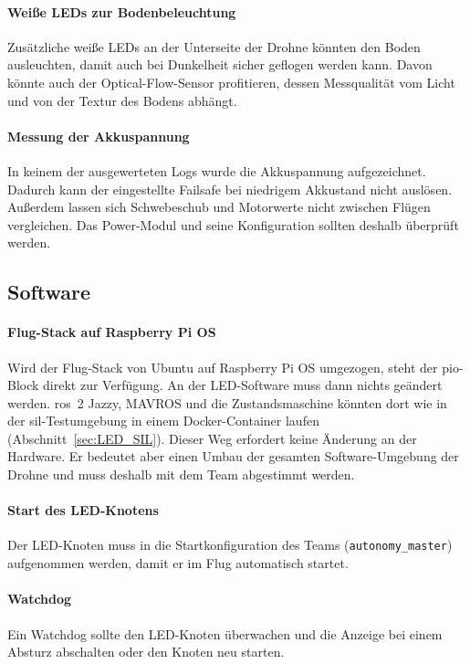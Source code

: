     \paragraph{Weiße LEDs zur Bodenbeleuchtung}
    Zusätzliche weiße LEDs an der Unterseite der Drohne könnten den Boden ausleuchten, damit auch bei Dunkelheit sicher geflogen werden kann. Davon könnte auch der Optical-Flow-Sensor profitieren, dessen Messqualität vom Licht und von der Textur des Bodens abhängt. %

    \paragraph{Messung der Akkuspannung}
    In keinem der ausgewerteten Logs wurde die Akkuspannung aufgezeichnet. Dadurch kann der eingestellte Failsafe bei niedrigem Akkustand nicht auslösen. Außerdem lassen sich Schwebeschub und Motorwerte nicht zwischen Flügen vergleichen. Das Power-Modul und seine Konfiguration sollten deshalb überprüft werden.

    \subsection{Software}
    \label{sec:Ausblick_Software}

    \paragraph{Flug-Stack auf Raspberry Pi OS}
    Wird der Flug-Stack von Ubuntu auf Raspberry Pi OS umgezogen, steht der \gls{pio}-Block direkt zur Verfügung. An der LED-Software muss dann nichts geändert werden. \gls{ros}~2 Jazzy, MAVROS und die Zustandsmaschine könnten dort wie in der \gls{sil}-Testumgebung in einem Docker-Container laufen (Abschnitt~\ref{sec:LED_SIL}). Dieser Weg erfordert keine Änderung an der Hardware. Er bedeutet aber einen Umbau der gesamten Software-Umgebung der Drohne und muss deshalb mit dem Team abgestimmt werden.

    \paragraph{Start des LED-Knotens}
    Der LED-Knoten muss in die Startkonfiguration des Teams (\texttt{autonomy\_master}) aufgenommen werden, damit er im Flug automatisch startet.

    \paragraph{Watchdog}
    Ein Watchdog sollte den LED-Knoten überwachen und die Anzeige bei einem Absturz abschalten oder den Knoten neu starten.

